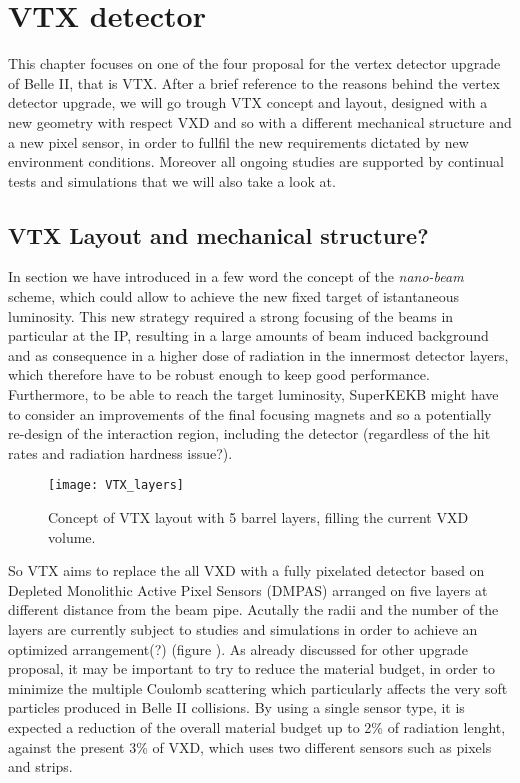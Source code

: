\chapter{VTX detector}

This chapter focuses on one of the four proposal for the vertex detector upgrade of Belle II, that is VTX. After a brief reference to the reasons behind the vertex detector upgrade, we will go trough VTX concept and layout, designed with a new geometry with respect VXD and so with a different mechanical structure and a new pixel sensor, in order to fullfil the new requirements dictated by new environment conditions. Moreover all ongoing studies are supported by continual tests and simulations that we will also take a look at.


\section{VTX Layout and mechanical structure?}

In section  we have introduced in a few word the concept of the \textit{nano-beam} scheme, which could allow to achieve the new fixed target of istantaneous luminosity. This new strategy required a strong focusing of the beams in particular at the IP, resulting in a large amounts of beam induced background and as consequence in a higher dose of radiation in the innermost detector layers, which therefore have to be robust enough to keep good performance.
Furthermore, to be able to reach the target luminosity, SuperKEKB might have to consider an improvements of the final focusing magnets and so a potentially re-design of the interaction region, including the detector (regardless of the hit rates and radiation hardness issue?).\\

\begin{figure}[h!]
\centering
\texttt{[image: VTX\_layers]}
\caption{Concept of VTX layout with 5 barrel layers, filling the current VXD volume.}
\label{fig:VTX_layers}
\end{figure}


So VTX aims to replace the all VXD with a fully pixelated detector based on Depleted Monolithic Active Pixel Sensors (DMPAS) arranged on five layers at different distance from the beam pipe. Acutally the radii and the number of the layers are currently subject to studies and simulations in order to achieve an optimized arrangement(?) (figure ). 
As already discussed for other upgrade proposal, it may be important to try to reduce the material budget, in order to minimize the multiple Coulomb scattering which particularly affects the very soft particles produced in Belle II collisions. By using a single sensor type, it is expected a reduction of the overall material budget up to 2\% of radiation lenght, against the present 3\% of VXD, which uses two different sensors such as pixels and strips.


